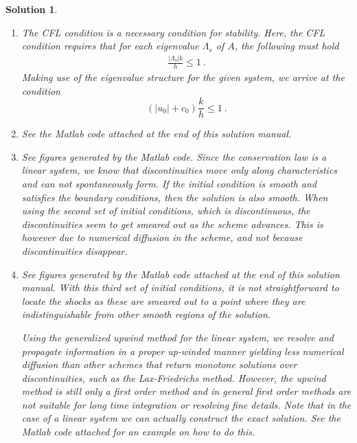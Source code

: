 \documentclass[10pt,letterpaper]{article}
\newcommand{\sqb}[1]{ \left(  {#1} \right) }
\theoremstyle{break}
\newtheorem{solution}{Solution}
\begin{document}
\begin{solution}
\begin{enumerate}
\begin{gather}
{\begin{array}{cc}
					(\rho_0c_0)^{-1} (-\Lambda_1^+ + \Lambda_2^+)& (\Lambda_1^+ + \Lambda_2^+)
				\end{array}}
		\end{gather}
		and
		\begin{gather}
			A^{-}=S\Lambda^{-}S^{-1}
				=\frac{1}{2}\sqb{\begin{array}{cc}
					(\Lambda_1^- + \Lambda_2^-) & \rho_{0}c_{0} (-\Lambda_1^- + \Lambda_2^-)\\
					(\rho_0c_0)^{-1} (-\Lambda_1^- + \Lambda_2^-)& (\Lambda_1^- + \Lambda_2^-)
				\end{array}}\ .
		\end{gather}


		\item
		The CFL condition is a necessary condition for stability.
		Here, the CFL condition requires that for each eigenvalue $\Lambda_{s}$ of $A$, the following must hold
		\begin{gather}
			\frac{|\Lambda_{s}|k}{h} \leq1\ .
		\end{gather}
		Making use of the eigenvalue structure for the given system, we arrive at the condition
		\begin{equation}
			\left(|u_{0}|+c_{0}\right)\frac{k}{h}\leq1\ .
		\end{equation}



		\item
		See the Matlab code attached at the end of this solution manual.


		\item
		See figures generated by the Matlab code.
		Since the conservation law is a linear system, we know that discontinuities move only along characteristics and can not spontaneously form.
		If the initial condition is smooth and satisfies the boundary conditions, then the solution is also smooth.
		When using the second set of initial conditions, which is  discontinuous, the discontinuities
		seem to get smeared out as the scheme advances.
		This is however due to numerical diffusion in the scheme, and not because discontinuities disappear.


		\item
		See figures generated by the Matlab code attached at the end of this solution manual.
		With this third set of initial conditions, it is not straightforward to locate the shocks as these are smeared out to a point where they are indistinguishable from other smooth regions of the solution.

		Using the generalized upwind method for the linear system, we resolve and propagate information in a proper up-winded manner yielding less numerical diffusion than other schemes that return monotone solutions over discontinuities, such as the Lax-Friedrichs method.
		However, the upwind method is still only a first order method and in general first order methods are not suitable for long time integration or resolving fine details.
		Note that in the case of a linear system we can actually construct the exact solution.
		See the Matlab code attached for an example on how to do this. 



\end{enumerate}
\end{solution}
\end{document}
